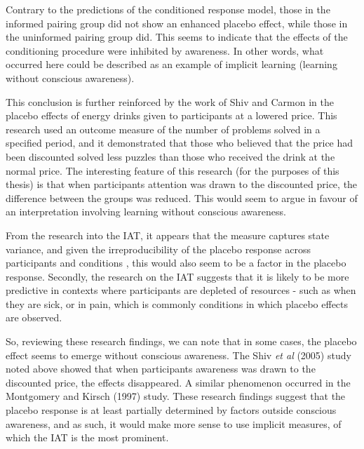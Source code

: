 Contrary to the predictions of the conditioned response model, those in the informed pairing group did not show an enhanced placebo effect, while those in the uninformed pairing group did. This seems to indicate that the effects of the conditioning procedure were inhibited by awareness. In other words, what occurred here could be described as an example of implicit learning (learning without conscious awareness).

This conclusion is further reinforced by the work of Shiv and Carmon \cite{Shiv2005a} in the placebo effects of energy drinks given to participants at a lowered price. This research used an outcome measure of the number of problems solved in a specified period, and it demonstrated that those who believed that the price had been discounted solved less puzzles than those who received the drink at the normal price. The interesting feature of this research (for the purposes of this thesis) is that when participants attention was drawn to the discounted price, the difference between the groups was reduced. This would seem to argue in favour of an interpretation involving learning without conscious awareness. 

From the research into the IAT, it appears that the measure captures state variance, and given the irreproducibility of the placebo response across participants and conditions \cite{Whalley2008,Shapiro1997}, this would also seem to be a factor in the placebo response. Secondly, the research on the IAT suggests that it is likely to be more predictive in contexts where participants are depleted of resources - such as when they are sick, or in pain, which is commonly conditions in which placebo effects are observed. 



So, reviewing these research findings, we can note that in some cases, the placebo effect seems to emerge without conscious awareness. The Shiv \textit{et al} (2005) study noted above showed that when participants awareness was drawn to the discounted price, the effects disappeared. A similar phenomenon occurred in the Montgomery and Kirsch (1997) \cite{Montgomery1997} study. These research findings suggest that the placebo response is at least partially determined by factors outside conscious awareness, and as such, it would make more sense to use implicit measures, of which the IAT is the most prominent. 

